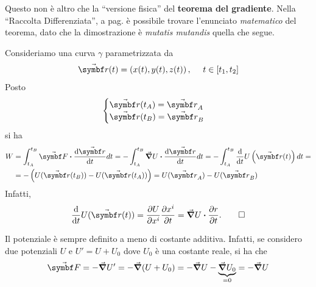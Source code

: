 \begin{observe}
	Questo non è altro che la ``versione fisica''  del \textbf{teorema del gradiente}. Nella ``Raccolta Differenziata'', a pag. \pageref{thmgradiente} è possibile trovare l'enunciato \textit{matematico} del teorema, dato che la dimostrazione è \textit{mutatis mutandis} quella che segue.
\end{observe}
\begin{demonstration}
	Consideriamo una curva $\gamma$ parametrizzata da
	\begin{equation*}
		\vba{r}(t)=\left(x(t),y(t),z(t)\right),\ \quad t\in\left[t_1,t_2\right]
	\end{equation*}
	Posto
	\begin{equation*}
		\begin{cases}
			\vba{r}(t_A)=\vba{r}_A\\
			\vba{r}(t_B)=\vba{r}_B
		\end{cases}
	\end{equation*}
si ha
\begin{align*}
	W&=\int_{t_A}^{t_B}\vba{F}\vdot\dv{\vba{r}}{t}dt=-\int_{t_A}^{t_B}\grad{U}\vdot\dv{\vba{r}}{t}dt=-\int_{t_A}^{t_B}\dv{t}U\left(\vba{r}(t)\right)dt=\\
	&=-\left(U(\vba{r}(t_B))-U(\vba{r}(t_A))\right)=U(\vba{r}_A)-U(\vba{r}_B)
\end{align*}
Infatti,
\begin{equation*}
	\dv{t}U(\vba{r}(t))=\pdv{U}{x^i}\pdv{x^i}{t}=\grad{U}\vdot\pdv{r}{t}.\qedhere
\end{equation*}
\end{demonstration}
\begin{observe}
	Il potenziale è sempre definito a meno di costante additiva. Infatti, se considero due potenziali $U$ e $U'=U+U_0$ dove $U_0$ è una costante reale, si ha che
	\begin{equation*}
		\vba{F}=-\grad{U'}=-\grad{(U+U_0)}=-\grad{U}-\underbrace{\grad{U_0}}_{=0}=-\grad{U}
	\end{equation*}
\end{observe}
